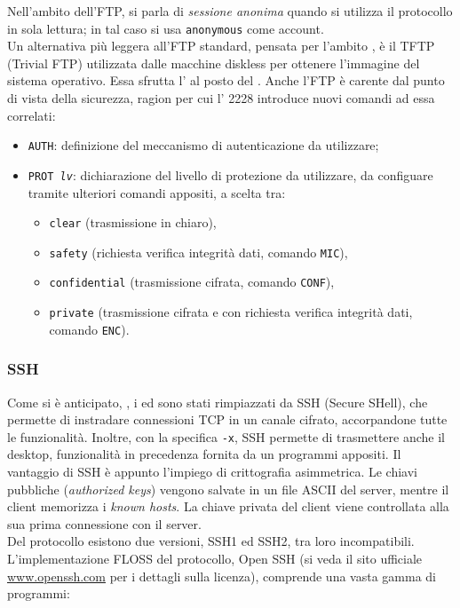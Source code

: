 \documentclass[a4paper, twoside]{article}
\def\code#1{\texttt{#1}}
\def\subsub#1{\subsubsection{#1}\label{#1}}
\def\vedi#1{\nameref{#1}}
\def\italic#1{\textit{#1}}
\begin{document}
Nell'ambito dell'FTP, si parla di \textit{sessione anonima} quando si utilizza il protocollo in sola lettura; in tal caso si usa \code{anonymous} come account.\\
Un alternativa più leggera all'FTP standard, pensata per l'ambito \vedi{LAN}, è il TFTP (Trivial FTP) utilizzata dalle macchine diskless per ottenere l'immagine del sistema operativo. Essa sfrutta l'\vedi{UDP} al posto del \vedi{TCP}. Anche l'FTP è carente dal punto di vista della sicurezza, ragion per cui l'\vedi{RFC} 2228 introduce nuovi comandi ad essa correlati:
\begin{itemize}
\item \code{AUTH}: definizione del meccanismo di autenticazione da utilizzare;
\item \code{PROT \italic{lv}}: dichiarazione del livello di protezione da utilizzare, da configuare tramite ulteriori comandi appositi, a scelta tra:
	\begin{itemize}
		\item \code{clear} (trasmissione in chiaro),
		\item \code{safety} (richiesta verifica integrità dati, comando \code{MIC}),
		\item \code{confidential} (trasmissione cifrata, comando \code{CONF}),
		\item \code{private} (trasmissione cifrata e con richiesta verifica integrità dati, comando \code{ENC}).
	\end{itemize}
\end{itemize}
\subsub{SSH}
Come si è anticipato, \vedi{Telnet}, i \vedi{Comandi r} ed  \vedi{FTP} sono stati rimpiazzati da SSH (Secure SHell), che permette di instradare connessioni TCP in un canale cifrato, accorpandone tutte le funzionalità. Inoltre, con la specifica \code{-x}, SSH permette di trasmettere anche il desktop, funzionalità in precedenza fornita da un programmi appositi. Il vantaggio di SSH è appunto l'impiego di crittografia asimmetrica. 
Le chiavi pubbliche (\textit{authorized keys}) vengono salvate in un file ASCII del server, mentre il client memorizza i \textit{known hosts}. La chiave privata del client viene controllata alla sua prima connessione con il server.\\ 
Del protocollo esistono due versioni, SSH1 ed SSH2, tra loro incompatibili.\\
L'implementazione FLOSS del protocollo, Open SSH (si veda il sito ufficiale \url{www.openssh.com} per i dettagli sulla licenza), comprende una vasta gamma di programmi:
\end{document}
